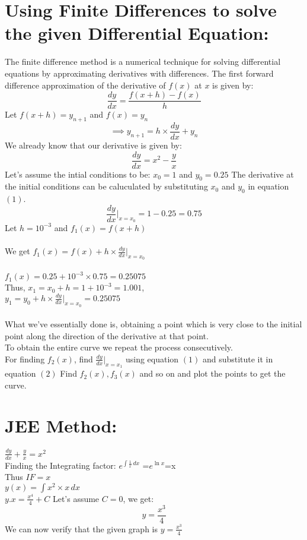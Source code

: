 \documentclass[journal]{IEEEtran}
\begin{document}
\section*{Using Finite Differences to solve the given Differential Equation: }
The finite difference method is a numerical technique for solving differential equations by approximating derivatives with differences.
The first forward difference approximation of the derivative of $f(x)$ at $x$ is given by:
\begin{equation}
    \frac{dy}{dx}=\frac{f(x+h)-f(x)}{h}
\end{equation}
Let $f(x+h)=y_{n+1}$ and $f(x)=y_n$
\begin{equation}
    \implies y_{n+1}=h\times\frac{dy}{dx}+y_n
\end{equation}
We already know that our derivative is given by:
$$\frac{dy}{dx}=x^2-\frac{y}{x}$$
Let's assume the intial conditions to be: $x_0=1$ and $y_0=0.25$
The derivative at the initial conditions can be caluculated by substituting $x_0$ and $y_0$ in equation $(1)$.\\
$$\frac{dy}{dx}|_{x=x_0}=1-0.25 =0.75$$
Let $h=10^{-3}$ and $f_1(x)=f(x+h)$\\\\
We get $f_1(x)=f(x)+h\times\frac{dy}{dx}|_{x=x_0} $\\\\
$f_1(x)=0.25+10^{-3}\times0.75=0.25075$\\
Thus, $x_1=x_0+h=1+10^{-3}=1.001$,\\$y_1=y_0+h\times\frac{dy}{dx}|_{x=x_0}=0.25075$\\\\
What we've essentially done is, obtaining a point which is very close to the initial point along the direction of the derivative at that point.\\To obtain the entire curve we repeat the process consecutively.\\For finding $f_2(x)$, find $\frac{dy}{dx}|_{x=x_1}$ using equation $(1)$ and substitute it in equation $(2)$ Find $f_2(x), f_3(x)$ and so on and plot the points to get the curve.
\section*{JEE Method:}
$\frac{dy}{dx}+\frac{y}{x}=x^2$\\
Finding the Integrating factor:
$e^{\int \frac{1}{x} \, dx}$ =$e^{\ln{x}}$=x\\
Thus $IF = x$ \\
$y(x)=\int x^2\times x\, dx$\\
$y.x = \frac{x^4}{4}+C$
Let's assume $C=0$, we get:\\
$$y=\frac{x^3}{4}$$
We can now verify that the given graph is $y=\frac{x^3}{4}$
\end{document}

